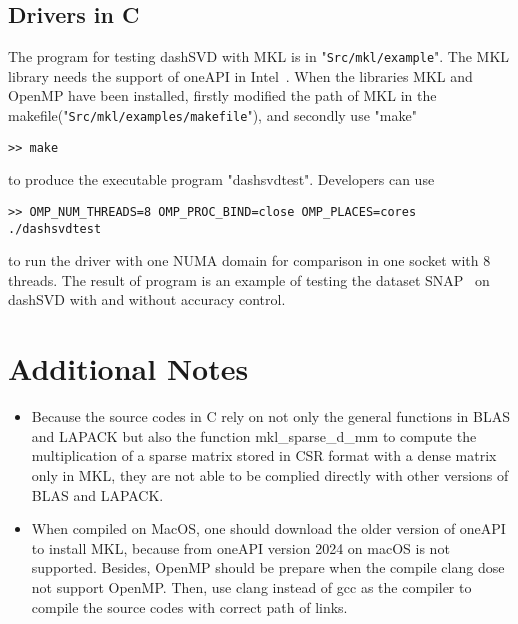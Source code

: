 \documentclass{ol-softwaremanual}
\newcommand{\cmtt}{\fontfamily{cmtt}\selectfont}
\begin{document}
\subsection{Drivers in C}

The program for testing dashSVD with MKL is in "\texttt{Src/mkl/example}". The MKL library needs the support of oneAPI in Intel~\cite{Intel}. When the libraries MKL and OpenMP have been installed, firstly modified the path of MKL in the makefile("\texttt{Src/mkl/examples/makefile}"), and secondly use "make" 
\begin{lstlisting} 
>> make
\end{lstlisting}
to produce the executable program "dashsvdtest". Developers can use
\begin{lstlisting} 
>> OMP_NUM_THREADS=8 OMP_PROC_BIND=close OMP_PLACES=cores ./dashsvdtest
\end{lstlisting}
to run the driver with one NUMA domain for comparison in one socket with 8 threads. The result of program is an example of testing the dataset SNAP~\cite{snapnets} on dashSVD with and without accuracy control.
\section{Additional Notes}
\begin{itemize}
\item Because the source codes in C rely on not only the general functions in BLAS and LAPACK but also the function {
\cmtt mkl\_sparse\_d\_mm
} to compute the multiplication of a sparse matrix stored in CSR format with a dense matrix only in MKL, they are not able to be complied directly with other versions of BLAS and LAPACK.
\item When compiled on MacOS, one should download the older version of oneAPI to install MKL, because from oneAPI version 2024 on macOS is not supported. Besides,  OpenMP should be prepare when the compile clang dose not support OpenMP. Then, use clang instead of gcc as the compiler to compile the source codes with correct path of links. 
\end{itemize}


	
	
\end{document}
